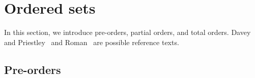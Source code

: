 
\section{Ordered sets}

\label{sec:tradeoffs-ordered-sets}


%


In this section, we introduce pre-orders, partial orders, and total orders.
Davey and Priestley~\cite{davey02} and Roman~\cite{roman08} are possible reference texts.


\vspace{2cm}

\subsection{Pre-orders}


\begin{marginfigure}
    \centering
    \caption[A pre-order represented as a graph.]{A  represented as a graph.}
    \label{fig:pre_order_graph}
\end{marginfigure}

